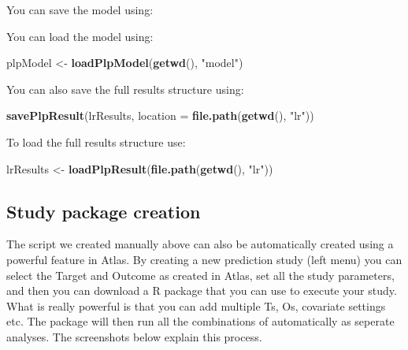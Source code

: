 \documentclass[]{article}
\newenvironment{Shaded}{\begin{snugshade}}{\end{snugshade}}
\newcommand{\KeywordTok}[1]{\textcolor[rgb]{0.13,0.29,0.53}{\textbf{#1}}}
\newcommand{\DataTypeTok}[1]{\textcolor[rgb]{0.13,0.29,0.53}{#1}}
\newcommand{\StringTok}[1]{\textcolor[rgb]{0.31,0.60,0.02}{#1}}
\newcommand{\OperatorTok}[1]{\textcolor[rgb]{0.81,0.36,0.00}{\textbf{#1}}}
\newcommand{\NormalTok}[1]{#1}
\begin{document}
You can save the model using:

\begin{Shaded}
\end{Shaded}

You can load the model using:

\begin{Shaded}
\begin{Highlighting}[]
\NormalTok{plpModel <-}\StringTok{ }\KeywordTok{loadPlpModel}\NormalTok{(}\KeywordTok{getwd}\NormalTok{(), }\StringTok{"model"}\NormalTok{)}
\end{Highlighting}
\end{Shaded}

You can also save the full results structure using:

\begin{Shaded}
\begin{Highlighting}[]
\KeywordTok{savePlpResult}\NormalTok{(lrResults, }\DataTypeTok{location =} \KeywordTok{file.path}\NormalTok{(}\KeywordTok{getwd}\NormalTok{(), }\StringTok{"lr"}\NormalTok{))}
\end{Highlighting}
\end{Shaded}

To load the full results structure use:

\begin{Shaded}
\begin{Highlighting}[]
\NormalTok{lrResults <-}\StringTok{ }\KeywordTok{loadPlpResult}\NormalTok{(}\KeywordTok{file.path}\NormalTok{(}\KeywordTok{getwd}\NormalTok{(), }\StringTok{"lr"}\NormalTok{))}
\end{Highlighting}
\end{Shaded}

\newpage

\subsection{Study package creation}\label{study-package-creation}

The script we created manually above can also be automatically created
using a powerful feature in Atlas. By creating a new prediction study
(left menu) you can select the Target and Outcome as created in Atlas,
set all the study parameters, and then you can download a R package that
you can use to execute your study. What is really powerful is that you
can add multiple Ts, Os, covariate settings etc. The package will then
run all the combinations of automatically as seperate analyses. The
screenshots below explain this process.
\end{document}
